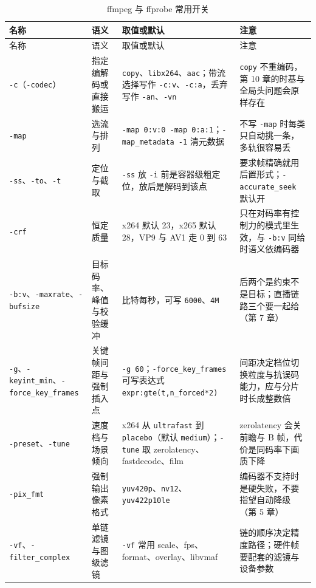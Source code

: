 \documentclass[12pt,a4paper,fontset=fandol]{ctexbook}
\newcommand{\Tp}[1]{\texttt{#1}}
\newcommand{\Bk}{\discretionary{}{}{}}
\begin{document}
\begin{longtable}{>{\raggedright\arraybackslash}p{}
                  >{\raggedright\arraybackslash}p{}
                  >{\raggedright\arraybackslash}p{}
                  >{\raggedright\arraybackslash}p{}}
\caption{ffmpeg 与 ffprobe 常用开关}\label{tab:apB-cli} \\
\toprule
名称 & 语义 & 取值或默认 & 注意 \\
\midrule
\endfirsthead
\toprule
名称 & 语义 & 取值或默认 & 注意 \\
\midrule
\endhead
\midrule
\endfoot
\bottomrule
\endlastfoot
\Tp{-{\Bk}c}（\Tp{-{\Bk}codec}） & 指定编解码或直接搬运 & \Tp{copy}、\Tp{libx264}、\Tp{aac}；带流选择写作 \Tp{-{\Bk}c:v}、\Tp{-{\Bk}c:a}，丢弃写作 \Tp{-{\Bk}an}、\Tp{-{\Bk}vn} & \Tp{copy} 不重编码，第 10 章的时基与全局头问题会原样存在 \\
\Tp{-{\Bk}map} & 选流与排列 & \Tp{-{\Bk}map 0:v:0 -{\Bk}map 0:a:1}；\Tp{-{\Bk}map\_{\Bk}metada{\Bk}ta -{\Bk}1} 清元数据 & 不写 \Tp{-{\Bk}map} 时每类只自动挑一条，多轨很容易丢 \\
\Tp{-{\Bk}ss}、\Tp{-{\Bk}to}、\Tp{-{\Bk}t} & 定位与截取 & \Tp{-{\Bk}ss} 放 \Tp{-{\Bk}i} 前是容器级粗定位，放后是解码到该点 & 要求帧精确就用后置形式；\Tp{-{\Bk}accura{\Bk}te\_{\Bk}seek} 默认开 \\
\Tp{-{\Bk}crf} & 恒定质量 & x264 默认 23，x265 默认 28，VP9 与 AV1 走 0 到 63 & 只在对码率有控制力的模式里生效，与 \Tp{-{\Bk}b:v} 同给时语义依编码器 \\
\Tp{-{\Bk}b:v}、\Tp{-{\Bk}maxrate}、\Tp{-{\Bk}bufsize} & 目标码率、峰值与校验缓冲 & 比特每秒，可写 \Tp{6000}、\Tp{4M} & 后两个是约束不是目标；直播链路三个要一起给（第 7 章） \\
\Tp{-{\Bk}g}、\Tp{-{\Bk}keyint\_{\Bk}min}、\Tp{-{\Bk}force\_{\Bk}key\_{\Bk}frames} & 关键帧间距与强制插入点 & \Tp{-{\Bk}g 60}；\Tp{-{\Bk}force\_{\Bk}key\_{\Bk}frames} 可写表达式 \Tp{expr:gte(t,n\_{\Bk}forced*2)} & 间距决定档位切换粒度与抗误码能力，应与分片时长成整数倍 \\
\Tp{-{\Bk}preset}、\Tp{-{\Bk}tune} & 速度档与场景倾向 & x264 从 \Tp{ultrafast} 到 \Tp{placebo}（默认 \Tp{medium}）；\Tp{-{\Bk}tune} 取 zerolatency、fastdecode、film & zerolatency 会关前瞻与 B 帧，代价是同码率下画质下降 \\
\Tp{-{\Bk}pix\_{\Bk}fmt} & 强制输出像素格式 & \Tp{yuv420p}、\Tp{nv12}、\Tp{yuv422p1{\Bk}0le} & 编码器不支持时是硬失败，不要指望自动降级（第 5 章） \\
\Tp{-{\Bk}vf}、\Tp{-{\Bk}filter\_{\Bk}complex} & 单链滤镜与图级滤镜 & \Tp{-{\Bk}vf} 常用 scale、fps、format、overlay、libvmaf & 链的顺序决定精度路径；硬件帧要配套的滤镜与设备参数 \\

\end{longtable}
\end{document}
